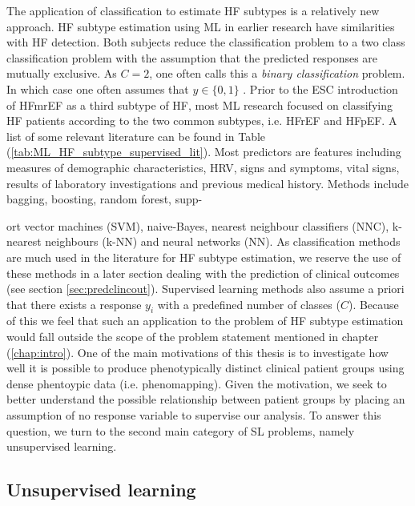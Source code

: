 \documentclass[../thesis.tex]{subfiles}
\begin{document}
\indent The application of classification to estimate HF subtypes is a relatively new approach. HF subtype estimation using ML in earlier research have similarities with HF detection. Both subjects reduce the classification problem to a two class classification problem with the assumption that the predicted responses are mutually exclusive. As $C = 2$, one often calls this a \textit{binary classification} problem. In which case one often assumes that $y \in \{0,1\}$ \citep{muphy2012machine}. Prior to the ESC introduction of HFmrEF as a third subtype of HF, most ML research focused on classifying HF patients according to the two common subtypes, i.e. HFrEF and HFpEF. A list of some relevant literature can be found in Table (\ref{tab:ML_HF_subtype_supervised_lit}). Most predictors are features including measures of demographic characteristics, HRV, signs and symptoms, vital signs, results of laboratory investigations and previous medical history. Methods include bagging, boosting, random forest, supp-



\noindent ort vector machines (SVM), naive-Bayes, nearest neighbour classifiers (NNC), k-nearest neighbours (k-NN) and neural networks (NN). As classification methods are much used in the literature for HF subtype estimation, we reserve the use of these methods in a later section dealing with the prediction of clinical outcomes (see section \ref{sec:predclincout}). Supervised learning methods also assume a priori that there exists a response $y_i$ with a predefined number of classes ($C$). Because of this we feel that such an application to the problem of HF subtype estimation would fall outside the scope of the problem statement mentioned in chapter (\ref{chap:intro}). One of the main motivations of this thesis is to investigate how well it is possible to produce phenotypically distinct clinical patient groups using dense phentoypic data (i.e. phenomapping). Given the motivation, we seek to better understand the possible relationship between patient groups by placing an assumption of no response variable to supervise our analysis. To answer this question, we turn to the second main category of SL problems, namely unsupervised learning.


\subsection{Unsupervised learning}
\label{subsec:unsupervisedlearn}
\end{document}
